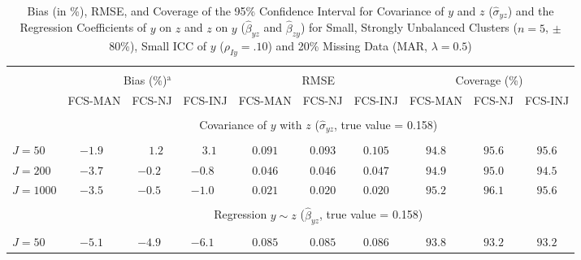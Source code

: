 \begin{table}
\begin{threeparttable}
\setlength{\tabcolsep}{1.2pt}
\renewcommand{\arraystretch}{1.00}
\small
\caption{\small Bias (in \%), RMSE, and Coverage of the 95\% Confidence Interval for Covariance of $y$ and $z$ ($\hat\sigma_{yz}$) and the Regression Coefficients of $y$ on $z$ and $z$ on $y$ ($\hat\beta_{yz}$ and $\hat\beta_{zy}$) for Small, Strongly Unbalanced Clusters ($n=5$, $\pm$80\%), Small ICC of $y$ ($\rho_{Iy}=.10$) and 20\% Missing Data (MAR, $\lambda=0.5$)\label{tab:supb}}
\begin{tabular}{lccccccccc}
\hline\\[-2.2ex]
 & \multicolumn{3}{c}{Bias (\%)$^\text{a}$} & \multicolumn{3}{c}{RMSE} & \multicolumn{3}{c}{Coverage (\%)} \\ \cmidrule(r){2-4}\cmidrule(r){5-7}\cmidrule(r){8-10}
  & FCS-MAN & FCS-NJ & FCS-INJ & FCS-MAN & FCS-NJ & FCS-INJ & FCS-MAN & FCS-NJ & \multicolumn{1}{c}{FCS-INJ} \\ 
[0.2ex]\hline\\[-2.0ex]
& \multicolumn{9}{c}{Covariance of $y$ with $z$ ($\hat\sigma_{yz}$, true value = 0.158)} \\[0.4ex]\hline\\[-2.0ex]
\nopagebreak $J=50$  & ${-}1.9\phantom{0}$ & $\phantom{-}1.2\phantom{0}$ & $\phantom{-}3.1\phantom{0}$ & $\phantom{0}0.091\phantom{0}$ & $\phantom{0}0.093\phantom{0}$ & $\phantom{0}0.105\phantom{0}$ & $\phantom{0}94.8\phantom{0}$ & $\phantom{0}95.6\phantom{0}$ & $\phantom{0}95.6\phantom{0}$ \\
\nopagebreak $J=200$  & ${-}3.7\phantom{0}$ & ${-}0.2\phantom{0}$ & ${-}0.8\phantom{0}$ & $\phantom{0}0.046\phantom{0}$ & $\phantom{0}0.046\phantom{0}$ & $\phantom{0}0.047\phantom{0}$ & $\phantom{0}94.9\phantom{0}$ & $\phantom{0}95.0\phantom{0}$ & $\phantom{0}94.5\phantom{0}$ \\
\nopagebreak $J=1000$  & ${-}3.5\phantom{0}$ & ${-}0.5\phantom{0}$ & ${-}1.0\phantom{0}$ & $\phantom{0}0.021\phantom{0}$ & $\phantom{0}0.020\phantom{0}$ & $\phantom{0}0.020\phantom{0}$ & $\phantom{0}95.2\phantom{0}$ & $\phantom{0}96.1\phantom{0}$ & $\phantom{0}95.6\phantom{0}$ \\
[0.5ex]\hline\\[-2.0ex] 
& \multicolumn{9}{c}{Regression $y \sim z$ ($\hat\beta_{yz}$, true value = 0.158)} \\[0.4ex]\hline\\[-2.0ex]
\nopagebreak $J=50$  & ${-}5.1\phantom{0}$ & ${-}4.9\phantom{0}$ & ${-}6.1\phantom{0}$ & $\phantom{0}0.085\phantom{0}$ & $\phantom{0}0.085\phantom{0}$ & $\phantom{0}0.086\phantom{0}$ & $\phantom{0}93.8\phantom{0}$ & $\phantom{0}93.2\phantom{0}$ & $\phantom{0}93.2\phantom{0}$ \\

\end{tabular}
\end{threeparttable}
\end{table}
